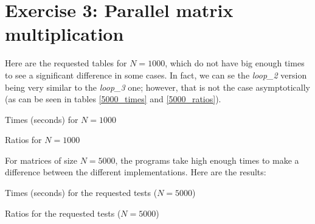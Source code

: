 \documentclass{article}
\begin{document}
\pagebreak

\section{Exercise 3: Parallel matrix multiplication}

Here are the requested tables for $N=1000$, which do not have big enough times to see a significant difference in some cases. In fact, we can se the \emph{loop\_2} version being very similar to the \emph{loop\_3} one; however, that is not the case asymptotically (as can be seen in tables \ref{5000_times} and \ref{5000_ratios}).

\begin{table}[h]
    
    \centering
    \caption{Times (seconds) for $N=1000$}
\end{table}

\begin{table}[h]
    
    \centering
    \caption{Ratios for $N=1000$}
\end{table}

For matrices of size $N=5000$, the programs take high enough times to make a difference between the different implementations. Here are the results:

\begin{table}[!h]
    
    \centering
    \caption{Times (seconds) for the requested tests ($N=5000$)}
    \label{5000_times}
\end{table}

\begin{table}[!h]
    
    \centering
    \caption{Ratios for the requested tests ($N=5000$)}
    \label{5000_ratios}
\end{table}
\end{document}
